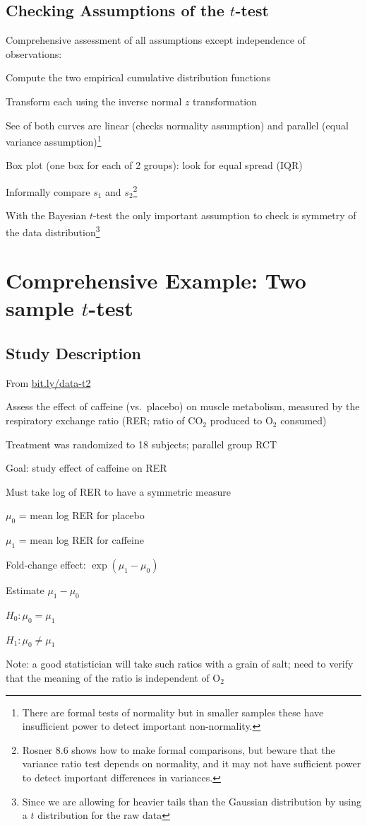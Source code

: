 \subsection{Checking Assumptions of the $t$-test}
\bi
\item Comprehensive assessment of all assumptions except independence of observations:
 \bi
 \item Compute the two empirical cumulative distribution functions
 \item Transform each using the inverse normal $z$ transformation
 \item See of both curves are linear (checks normality assumption) and parallel (equal variance assumption)\footnote{There are formal tests of normality but in smaller samples these have insufficient power to detect important non-normality.}
 \ei
\item Box plot (one box for each of 2 groups): look for equal spread
  (IQR)
\item Informally compare $s_{1}$ and $s_{2}$\footnote{Rosner 8.6 shows how to
  make formal comparisons, but beware that the variance ratio test
  depends on normality, and it may not have sufficient power to detect
  important differences in variances.}
\item With the Bayesian $t$-test the only important assumption to check is symmetry of the data distribution\footnote{Since we are allowing for heavier tails than the Gaussian distribution by using a $t$ distribution for the raw data}
\ei

\section{Comprehensive Example: Two sample $t$-test}

\subsection{Study Description}
From \href{http://learntech.uwe.ac.uk/da/Default.aspx?pageid=1438}{bit.ly/data-t2}

\bi
\item Assess the effect of caffeine (vs.\ placebo) on muscle
  metabolism, measured by the respiratory exchange ratio (RER; ratio
  of CO$_{2}$ produced to O$_{2}$ consumed)
\item Treatment was randomized to 18 subjects; parallel group RCT
\item Goal: study effect of caffeine on RER
\item Must take log of RER to have a symmetric measure
  \bi
  \item $\mu_0$ = mean log RER for placebo
  \item $\mu_1$ = mean log RER for caffeine
  \item Fold-change effect: $\exp(\mu_1 - \mu_0)$
  \item Estimate $ \mu_1 - \mu_0$
  \item $H_0: \mu_0 = \mu_1$
  \item $H_1: \mu_0 \neq \mu_1$
  \ei
  \item Note: a good statistician will take such ratios with a grain of salt; need to verify that the meaning of the ratio is independent of O$_{2}$
\ei

